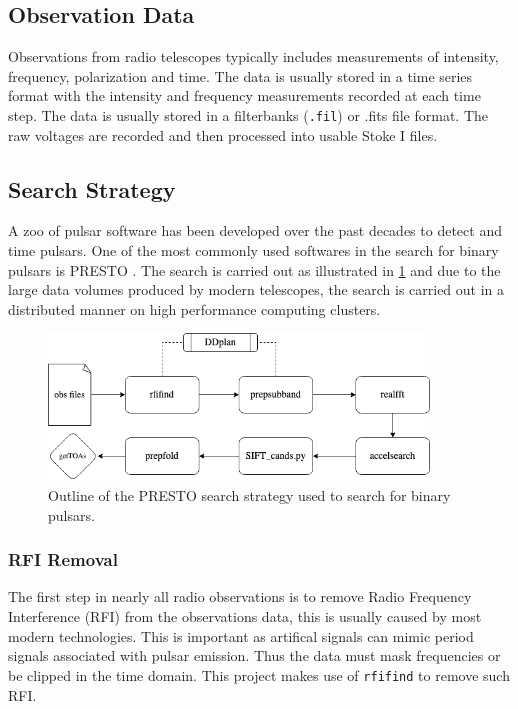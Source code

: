 \subsection{Observation Data} \label{sec:method-observation-data}

Observations from radio telescopes typically includes measurements of intensity, frequency, polarization and time. The data is usually stored in a time series format with the intensity and frequency measurements recorded at each time step. The data is usually stored in a  filterbanks (\texttt{.fil}) or .fits file format. The raw voltages are recorded and then processed into usable Stoke I files. 

\subsection{Search Strategy}

A zoo of pulsar software has been developed over the past decades to detect and time pulsars. One of the most commonly used softwares in the search for binary pulsars is PRESTO \citep{ransom_new_2001}. The search is carried out as illustrated in \cref{fig: presto-work-flow} and due to the large data volumes produced by modern telescopes, the search is carried out in a distributed manner on high performance computing clusters. \\ 

\begin{figure}
    \centering
    \includegraphics[width = 0.9\textwidth]{figs/presto-work-flow.drawio.png}
    \caption{Outline of the PRESTO search strategy used to search for binary pulsars.}
    \label{fig: presto-work-flow}
\end{figure}

\subsubsection{RFI Removal}

The first step in nearly all radio observations is to remove Radio Frequency Interference (RFI) from the observations data, this is usually caused by most modern technologies. This is important as artifical signals can mimic period signals associated with pulsar emission. Thus the data must mask frequencies or be clipped in the time domain. This project makes use of \texttt{rfifind} to remove such RFI. 


